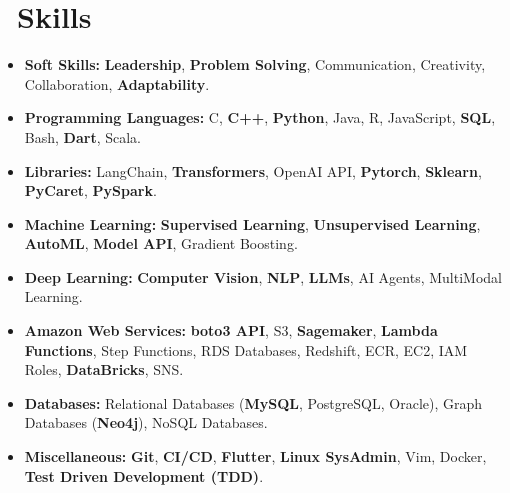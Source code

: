 \section{\texorpdfstring{\faCogs}{}\ Skills}
\begin{itemize}[parsep=0.5ex]
  \item \textbf{Soft Skills:} \textbf{Leadership}, \textbf{Problem Solving}, Communication, Creativity, Collaboration, \textbf{Adaptability}.
  \item \textbf{Programming Languages:} C, \textbf{C++}, \textbf{Python}, Java, R, JavaScript, \textbf{SQL}, Bash, \textbf{Dart}, Scala.
  \item  \textbf{Libraries:} LangChain, \textbf{Transformers}, OpenAI API, \textbf{Pytorch}, \textbf{Sklearn}, \textbf{PyCaret}, \textbf{PySpark}.
  \item \textbf{Machine Learning:} \textbf{Supervised Learning}, \textbf{Unsupervised Learning}, \textbf{AutoML}, \textbf{Model API}, Gradient Boosting.
  \item \textbf{Deep Learning:} \textbf{Computer Vision}, \textbf{NLP}, \textbf{LLMs}, AI Agents, MultiModal Learning.
  \item \textbf{Amazon Web Services:} \textbf{boto3 API}, S3, \textbf{Sagemaker}, \textbf{Lambda Functions}, Step Functions, RDS Databases, Redshift, ECR, EC2, IAM Roles, \textbf{DataBricks}, SNS.
  \item \textbf{Databases:} Relational Databases (\textbf{MySQL}, PostgreSQL, Oracle), Graph Databases (\textbf{Neo4j}), NoSQL Databases.
  \item \textbf{Miscellaneous:} \textbf{Git}, \textbf{CI/CD}, \textbf{Flutter}, \textbf{Linux SysAdmin}, Vim, Docker, \textbf{Test Driven Development (TDD)}.
\end{itemize}